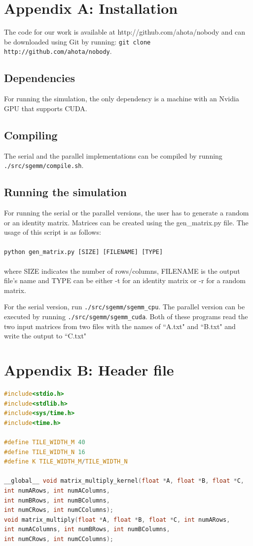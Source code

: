 \documentclass[11pt,a4paper]{article}
\begin{document}
	\section{Appendix A: Installation}
		The code for our work is available at http://github.com/ahota/nobody and can be downloaded using Git by running: \texttt{git clone http://github.com/ahota/nobody}.
		
		\subsection{Dependencies}
		For running the simulation, the only dependency is a machine with an Nvidia GPU that supports CUDA. 
		
		\subsection{Compiling}
		The serial and the parallel implementations can be compiled by running \texttt{./src/sgemm/compile.sh}. 
		
		\subsection{Running the simulation}
		For running the serial or the parallel versions, the user has to generate a random or an identity matrix. Matrices can be created using the gen\_matrix.py file. The usage of this script is as follows: 
		\\\\
		\texttt{python gen\_matrix.py [SIZE] [FILENAME] [TYPE]}
		\\\\
		where SIZE indicates the number of rows/columns, FILENAME is the output file's name and TYPE can be either -t for an identity matrix or -r for a random matrix.
		
		For the serial version, run \texttt{./src/sgemm/sgemm\_cpu}.
		The parallel version can be executed by running \texttt{./src/sgemm/sgemm\_cuda}. Both of these programs read the two input matrices from two files with the names of ``A.txt" and ``B.txt" and write the output to ``C.txt"
		
	\section{Appendix B: Header file}
	\begin{lstlisting}[language=c]
#include<stdio.h>
#include<stdlib.h>
#include<sys/time.h>
#include<time.h>

#define TILE_WIDTH_M 40
#define TILE_WIDTH_N 16
#define K TILE_WIDTH_M/TILE_WIDTH_N

__global__ void matrix_multiply_kernel(float *A, float *B, float *C,
int numARows, int numAColumns,
int numBRows, int numBColumns,
int numCRows, int numCColumns);
void matrix_multiply(float *A, float *B, float *C, int numARows,
int numAColumns, int numBRows, int numBColumns,
int numCRows, int numCColumns);
	\end{lstlisting}
	
\end{document}

